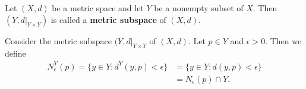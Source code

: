 \documentclass[a4paper]{report}
\begin{document}
\begin{definition}
    Let \( (X,d) \) be a metric space and let \( Y  \) be a nonempty subset of \( X  \). Then \( (Y, d |_{Y \times Y}) \) is called a \textbf{metric subspace} of \( (X,d) \).
\end{definition}

\begin{remark}
    Consider the metric subspace \( (Y, d |_{Y \times Y} \) of \( (X,d) \). Let \( p \in Y  \) and \( \epsilon > 0  \). Then we define
    \begin{align*} {N}_{\epsilon}^{Y}(p) = \{ y \in Y : d^{Y}(y,p) < \epsilon \} &= \{ y \in Y : d(y,p) < \epsilon \}   \\
        &= {N}_{\epsilon}(p) \cap Y.
    \end{align*}
\end{remark}
\end{document}
